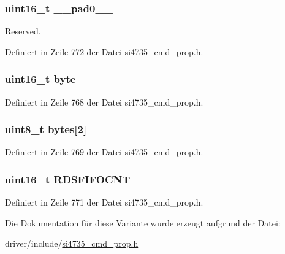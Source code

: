 \subsubsection[{\+\_\+\+\_\+pad0\+\_\+\+\_\+}]{\setlength{\rightskip}{0pt plus 5cm}uint16\+\_\+t \+\_\+\+\_\+pad0\+\_\+\+\_\+}\label{unionfm__rds__int__fifo__count_a77132c2c26a75f5b8751b235cda23828}


Reserved. 



Definiert in Zeile 772 der Datei si4735\+\_\+cmd\+\_\+prop.\+h.

\hypertarget{unionfm__rds__int__fifo__count_ab0549c1b5ea980a02e7eab77e21fea49}{}
\subsubsection[{byte}]{\setlength{\rightskip}{0pt plus 5cm}uint16\+\_\+t byte}\label{unionfm__rds__int__fifo__count_ab0549c1b5ea980a02e7eab77e21fea49}


Definiert in Zeile 768 der Datei si4735\+\_\+cmd\+\_\+prop.\+h.

\hypertarget{unionfm__rds__int__fifo__count_a46e4c05d20a047ec169f60d3167e912e}{}
\subsubsection[{bytes}]{\setlength{\rightskip}{0pt plus 5cm}uint8\+\_\+t bytes\mbox{[}2\mbox{]}}\label{unionfm__rds__int__fifo__count_a46e4c05d20a047ec169f60d3167e912e}


Definiert in Zeile 769 der Datei si4735\+\_\+cmd\+\_\+prop.\+h.

\hypertarget{unionfm__rds__int__fifo__count_a6273d3e5b093640f3492cb7eaad78cdc}{}
\subsubsection[{R\+D\+S\+F\+I\+F\+O\+C\+N\+T}]{\setlength{\rightskip}{0pt plus 5cm}uint16\+\_\+t R\+D\+S\+F\+I\+F\+O\+C\+N\+T}\label{unionfm__rds__int__fifo__count_a6273d3e5b093640f3492cb7eaad78cdc}


Definiert in Zeile 771 der Datei si4735\+\_\+cmd\+\_\+prop.\+h.



Die Dokumentation für diese Variante wurde erzeugt aufgrund der Datei\+:\begin{DoxyCompactItemize}
\item 
driver/include/\hyperlink{si4735__cmd__prop_8h}{si4735\+\_\+cmd\+\_\+prop.\+h}\end{DoxyCompactItemize}
